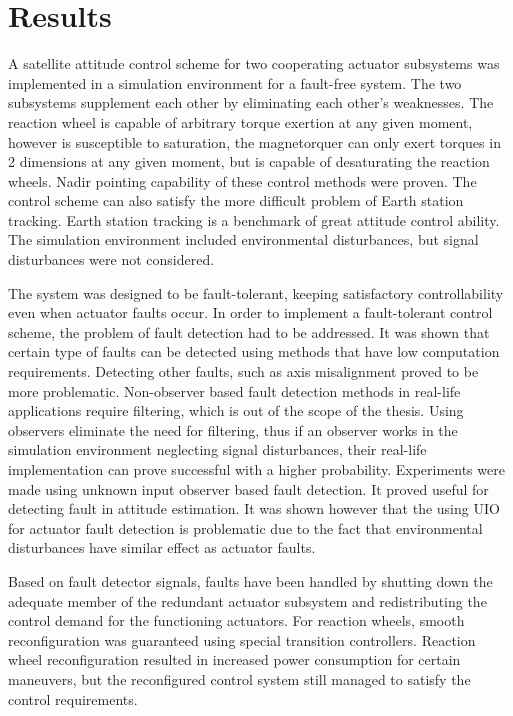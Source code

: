 \chapter{Results}

A satellite attitude control scheme for two cooperating actuator subsystems was implemented in a simulation environment for a fault-free system. The two subsystems supplement each other by eliminating each other's weaknesses. The reaction wheel is capable of arbitrary torque exertion at any given moment, however is susceptible to saturation, the magnetorquer can only exert torques in 2 dimensions at any given moment, but is capable of desaturating the reaction wheels. Nadir pointing capability of these control methods were proven. The control scheme can also satisfy the more difficult problem of Earth station tracking. Earth station tracking is a benchmark of great attitude control ability. The simulation environment included environmental disturbances, but signal disturbances were not considered.

The system was designed to be fault-tolerant, keeping satisfactory controllability even when actuator faults occur. In order to implement a fault-tolerant control scheme, the problem of fault detection had to be addressed. It was shown that certain type of faults can be detected using methods that have low computation requirements. Detecting other faults, such as axis misalignment proved to be more problematic. Non-observer based fault detection methods in real-life applications require filtering, which is out of the scope of the thesis. Using observers eliminate the need for filtering, thus if an observer works in the simulation environment neglecting signal disturbances, their real-life implementation can prove successful with a higher probability. Experiments were made using unknown input observer based fault detection. It proved useful for detecting fault in attitude estimation. It was shown however that the using UIO for actuator fault detection is problematic due to the fact that environmental disturbances have similar effect as actuator faults.

Based on fault detector signals, faults have been handled by shutting down the adequate member of the redundant actuator subsystem and redistributing the control demand for the functioning actuators. For reaction wheels, smooth reconfiguration was guaranteed using special transition controllers. Reaction wheel reconfiguration resulted in increased power consumption for certain maneuvers, but the reconfigured control system still managed to satisfy the control requirements.


